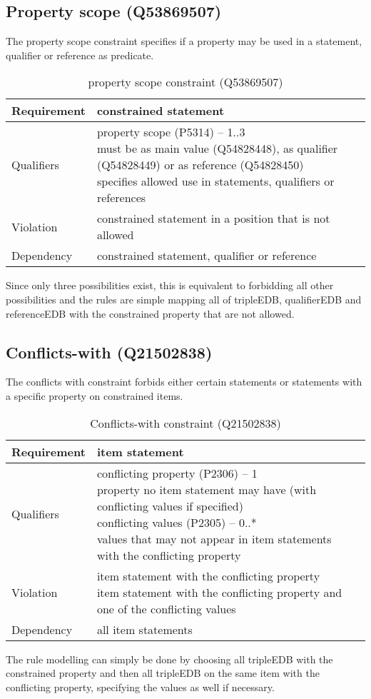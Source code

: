 \documentclass[hyperref,bachelorofscience,fleqn]{cgvpub}
\begin{document}
\subsection{Property scope (Q53869507)}
The property scope constraint specifies if a property may be used in a statement, qualifier or reference as predicate.
\begin{table}[H]
\caption{property scope constraint (Q53869507)}
\begin{tabularx}{\textwidth}{ ll X}
\hline
Requirement & constrained statement \\
\hline
Qualifiers & \makecell{property scope (P5314) -- 1..3 \\ must be as main value (Q54828448), as qualifier (Q54828449) or as reference (Q54828450) \\ specifies allowed use in statements, qualifiers or references} \\
\hline
Violation & constrained statement in a position that is not allowed \\
\hline
Dependency & constrained statement, qualifier or reference \\
\hline
\end{tabularx}
\end{table}

Since only three possibilities exist, this is equivalent to forbidding all other possibilities and the rules are simple mapping all of tripleEDB, qualifierEDB and referenceEDB with the constrained property that are not allowed.

\subsection{Conflicts-with (Q21502838)}
The conflicts with constraint forbids either certain statements or statements with a specific property on constrained items.
\begin{table}[H]
\caption{Conflicts-with constraint (Q21502838)}
\begin{tabularx}{\textwidth}{ ll X}
\hline
Requirement & item statement \\
\hline
Qualifiers & \makecell{conflicting property (P2306) -- 1 \\ property no item statement may have (with conflicting values if specified) \\
conflicting values (P2305) -- 0..* \\ values that may not appear in item statements with the conflicting property} \\
\hline
Violation & \makecell{item statement with the conflicting property \\ item statement with the conflicting property and one of the conflicting values} \\
\hline
Dependency & all item statements \\
\hline
\end{tabularx}
\end{table}
The rule modelling can simply be done by choosing all tripleEDB with the constrained property and then all tripleEDB on the same item with the conflicting property, specifying the values as well if necessary.
\end{document}
